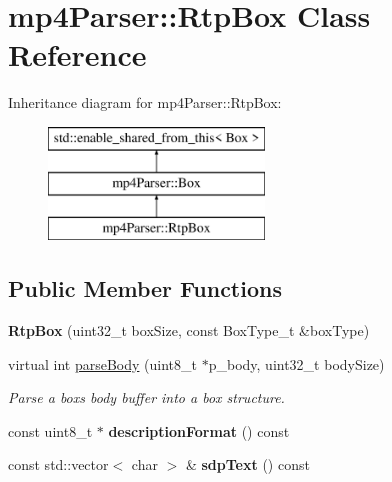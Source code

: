 \hypertarget{classmp4_parser_1_1_rtp_box}{}\section{mp4\+Parser\+::Rtp\+Box Class Reference}
\label{classmp4_parser_1_1_rtp_box}
Inheritance diagram for mp4\+Parser\+::Rtp\+Box\+:\begin{figure}[H]
\begin{center}
\leavevmode
\includegraphics[height=3.000000cm]{classmp4_parser_1_1_rtp_box}
\end{center}
\end{figure}
\subsection*{Public Member Functions}
\begin{DoxyCompactItemize}
\item 
\mbox{\label{classmp4_parser_1_1_rtp_box_a04f548ec38fefefac74a1b593c05eb1e}} 
{\bfseries Rtp\+Box} (uint32\+\_\+t box\+Size, const Box\+Type\+\_\+t \&box\+Type)
\item 
virtual int \mbox{\hyperlink{classmp4_parser_1_1_rtp_box_a732f4387776dc70dbb26c7e9219c65ef}{parse\+Body}} (uint8\+\_\+t $\ast$p\+\_\+body, uint32\+\_\+t body\+Size)
\begin{DoxyCompactList}\small\item\em Parse a box\textquotesingle{}s body buffer into a box structure. \end{DoxyCompactList}\item 
\mbox{\label{classmp4_parser_1_1_rtp_box_acd9e1945689fa846c1a1a8428c7ccec3}} 
const uint8\+\_\+t $\ast$ {\bfseries description\+Format} () const
\item 
\mbox{\label{classmp4_parser_1_1_rtp_box_aac0d0044021300170d760aa3ac7e9d45}} 
const std\+::vector$<$ char $>$ \& {\bfseries sdp\+Text} () const
\end{DoxyCompactItemize}
